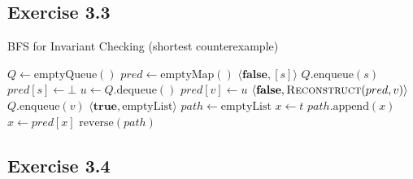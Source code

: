 \documentclass{article}
\begin{document}
	\subsection*{Exercise 3.3}
	
	\begin{algorithm}
		\caption{BFS for Invariant Checking (shortest counterexample)}
		\begin{algorithmic}[1]
			\State $Q \gets \text{emptyQueue}()$
			\State $pred \gets \text{emptyMap}()$ 
			\State \Return $\langle \textbf{false}, [s] \rangle$
			\EndIf
			\State $Q.\text{enqueue}(s)$
			\State $pred[s] \gets \bot$ 
			\EndFor
			\State $u \gets Q.\text{dequeue}()$
			 
			\State $pred[v] \gets u$
			\State \Return $\langle \textbf{false}, \textsc{Reconstruct}(pred, v) \rangle$
			\EndIf
			\State $Q.\text{enqueue}(v)$
			\EndIf
			\EndFor
			\EndWhile
			\State \Return $\langle \textbf{true}, \text{emptyList} \rangle$ 
			\EndProcedure
			\State $path \gets \text{emptyList}$
			\State $x \gets t$
			\State $path.\text{append}(x)$
			\State $x \gets pred[x]$
			\EndWhile
			\State \Return $\text{reverse}(path)$
			\EndProcedure
		\end{algorithmic}
	\end{algorithm}
	
	\subsection*{Exercise 3.4}
	
\end{document}
